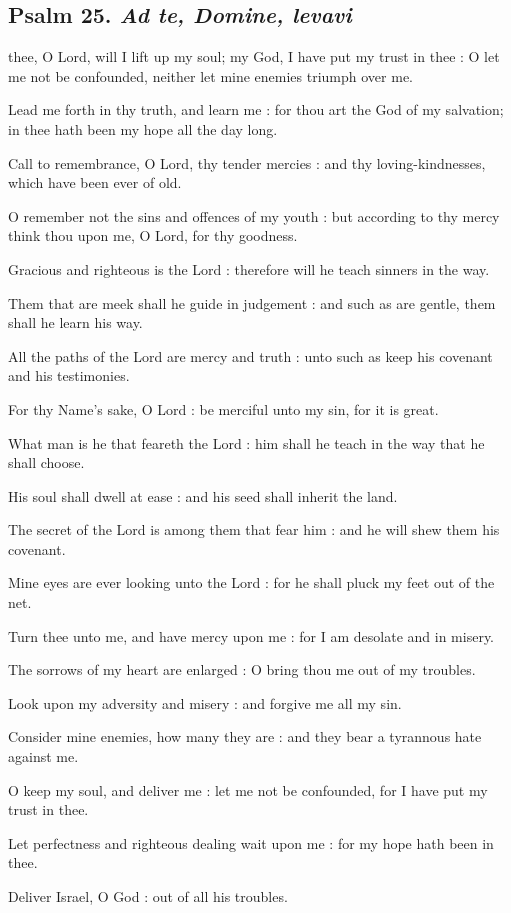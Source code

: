 \subsection{Psalm 25. \textit{Ad te, Domine, levavi}}

 thee, O Lord, will I lift up my soul; my God, I have put my trust in thee : O let me not be confounded, neither let mine enemies triumph over me.\par
{}
Lead me forth in thy truth, and learn me : for thou art the God of my salvation; in thee hath been my hope all the day long.\par
{}Call to remembrance, O Lord, thy tender mercies : and thy loving-kindnesses, which have been ever of old.\par
{}O remember not the sins and offences of my youth : but according to thy mercy think thou upon me, O Lord, for thy goodness.\par
{}Gracious and righteous is the Lord : therefore will he teach sinners in the way.\par
{}Them that are meek shall he guide in judgement : and such as are gentle, them shall he learn his way.\par
{}All the paths of the Lord are mercy and truth : unto such as keep his covenant and his testimonies.\par
{}For thy Name's sake, O Lord : be merciful unto my sin, for it is great.\par
{}What man is he that feareth the Lord : him shall he teach in the way that he shall choose.\par
{}His soul shall dwell at ease : and his seed shall inherit the land.\par
{}The secret of the Lord is among them that fear him : and he will shew them his covenant.\par
{}Mine eyes are ever looking unto the Lord : for he shall pluck my feet out of the net.\par
{}Turn thee unto me, and have mercy upon me : for I am desolate and in misery.\par
{}The sorrows of my heart are enlarged : O bring thou me out of my troubles.\par
{}Look upon my adversity and misery : and forgive me all my sin.\par
{}Consider mine enemies, how many they are : and they bear a tyrannous hate against me.\par
{}O keep my soul, and deliver me : let me not be confounded, for I have put my trust in thee.\par
{}Let perfectness and righteous dealing wait upon me : for my hope hath been in thee.\par
{}Deliver Israel, O God : out of all his troubles.\par

